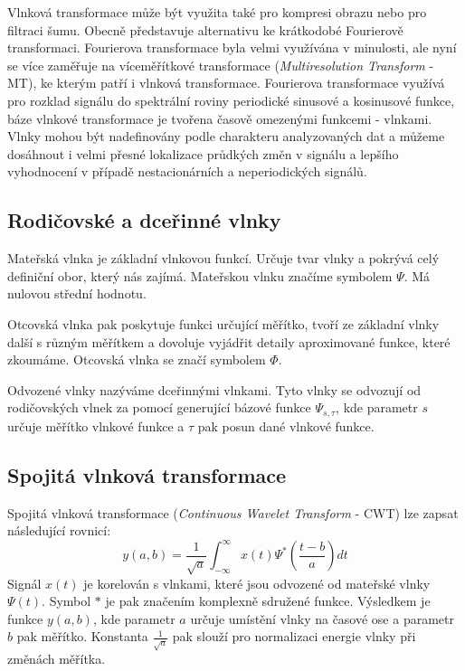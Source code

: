 Vlnková transformace může být využita také pro kompresi obrazu nebo pro filtraci šumu. \cite{WaveletHlavac} Obecně představuje alternativu ke krátkodobé Fourierově transformaci. Fourierova transformace byla velmi využívána v minulosti, ale nyní se více zaměřuje na víceměřítkové transformace (\textit{Multiresolution Transform} - MT), ke kterým patří i vlnková transformace. Fourierova transformace využívá pro rozklad signálu do spektrální roviny periodické sinusové a kosinusové funkce, báze vlnkové transformace je tvořena časově omezenými funkcemi - vlnkami. Vlnky mohou být nadefinovány podle charakteru analyzovaných dat a můžeme dosáhnout i velmi přesné lokalizace průdkých změn v signálu a lepšího vyhodnocení v případě nestacionárních a neperiodických signálů. \cite{WaveletElektrorevue}

\subsection{Rodičovské a dceřinné vlnky}
Mateřská vlnka je základní vlnkovou funkcí. Určuje tvar vlnky a pokrývá celý definiční obor, který nás zajímá. Mateřskou vlnku značíme symbolem $\Psi$. Má nulovou střední hodnotu.

Otcovská vlnka pak poskytuje funkci určující měřítko, tvoří ze základní vlnky další s různým měřítkem a dovoluje vyjádřit detaily aproximované funkce, které zkoumáme. Otcovská vlnka se značí symbolem $\Phi$.

Odvozené vlnky nazýváme dceřinnými vlnkami. Tyto vlnky se odvozují od rodičovských vlnek za pomocí generující bázové funkce $\Psi_{s,\tau}$, kde parametr $s$ určuje měřítko vlnkové funkce a $\tau$ pak posun dané vlnkové funkce. \cite{WaveletHlavac}

\subsection{Spojitá vlnková transformace}
Spojitá vlnková transformace (\textit{Continuous Wavelet Transform} - CWT) lze zapsat následující rovnicí: \cite{WaveletMathworks}
$$y(a,b) = \frac{1}{\sqrt{a}}\int_{-\infty}^{\infty} x(t)\Psi^*(\frac{t-b}{a}) dt$$
Signál $x(t)$ je korelován s vlnkami, které jsou odvozené od mateřské vlnky $\Psi(t)$. Symbol $*$ je pak značením komplexně sdružené funkce. Výsledkem je funkce $y(a,b)$, kde parametr $a$ určuje umístění vlnky na časové ose a parametr $b$ pak měřítko. Konstanta $\frac{1}{\sqrt{a}}$ pak slouží pro normalizaci energie vlnky při změnách měřítka.

